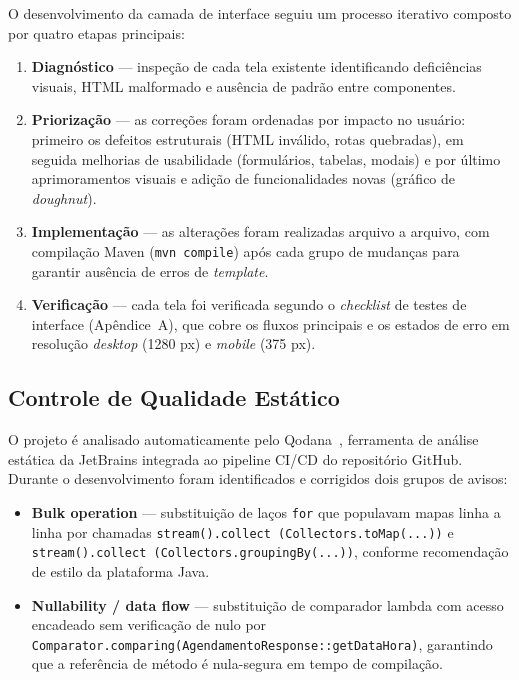 O desenvolvimento da camada de interface seguiu um processo iterativo
composto por quatro etapas principais:

\begin{enumerate}
  \item \textbf{Diagnóstico} — inspeção de cada tela existente identificando
    deficiências visuais, HTML malformado e ausência de padrão entre
    componentes.
  \item \textbf{Priorização} — as correções foram ordenadas por impacto no
    usuário: primeiro os defeitos estruturais (HTML inválido, rotas
    quebradas), em seguida melhorias de usabilidade (formulários, tabelas,
    modais) e por último aprimoramentos visuais e adição de funcionalidades
    novas (gráfico de \textit{doughnut}).
  \item \textbf{Implementação} — as alterações foram realizadas arquivo a
    arquivo, com compilação Maven (\texttt{mvn compile}) após cada grupo de
    mudanças para garantir ausência de erros de \textit{template}.
  \item \textbf{Verificação} — cada tela foi verificada segundo o
    \textit{checklist} de testes de interface (Apêndice~A), que cobre os
    fluxos principais e os estados de erro em resolução \textit{desktop}
    (1280 px) e \textit{mobile} (375 px).
\end{enumerate}

\subsection{Controle de Qualidade Estático}

O projeto é analisado automaticamente pelo Qodana~\cite{qodana}, ferramenta
de análise estática da JetBrains integrada ao pipeline CI/CD do repositório
GitHub.  Durante o desenvolvimento foram identificados e corrigidos dois
grupos de avisos:

\begin{itemize}
  \item \textbf{Bulk operation} — substituição de laços \texttt{for} que
    populavam mapas linha a linha por chamadas \texttt{stream().collect
    (Collectors.toMap(...))} e \texttt{stream().collect
    (Collectors.groupingBy(...))}, conforme recomendação de estilo da
    plataforma Java.
  \item \textbf{Nullability / data flow} — substituição de comparador
    lambda com acesso encadeado sem verificação de nulo por
    \texttt{Comparator.comparing(AgendamentoResponse::getDataHora)},
    garantindo que a referência de método é nula-segura em tempo de compilação.
\end{itemize}

